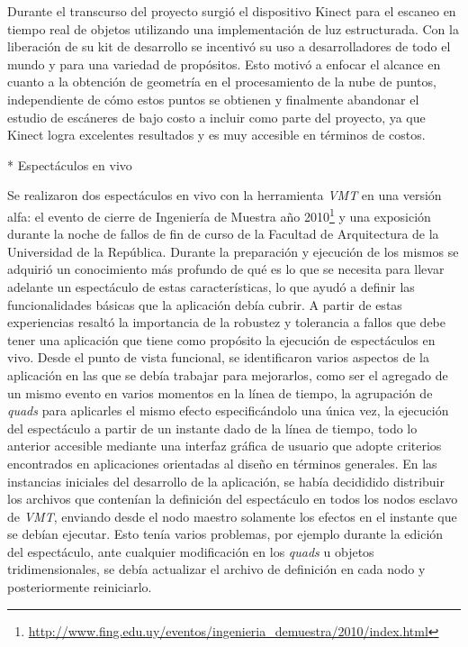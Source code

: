 Durante el transcurso del proyecto surgió el dispositivo Kinect para el escaneo en tiempo real de objetos utilizando una implementación de luz estructurada. Con la liberación de su kit de desarrollo se incentivó su uso a desarrolladores de todo el mundo y para una variedad de propósitos. Esto motivó a enfocar el alcance en cuanto a la obtención de geometría en el procesamiento de la nube de puntos, independiente de cómo estos puntos se obtienen y finalmente abandonar el estudio de escáneres de bajo costo a incluir como parte del proyecto, ya que Kinect logra excelentes resultados y es muy accesible en términos de costos.


* Espectáculos en vivo

Se realizaron dos espectáculos en vivo con la herramienta \emph{VMT} en una versión alfa: el evento de cierre de Ingeniería de Muestra año 2010\footnote{\url{http://www.fing.edu.uy/eventos/ingenieria_demuestra/2010/index.html}} y una exposición durante la noche de fallos de fin de curso de la Facultad de Arquitectura de la Universidad de la República. Durante la preparación y ejecución de los mismos se adquirió un conocimiento más profundo de qué es lo que se necesita para llevar adelante un espectáculo de estas características, lo que ayudó a definir las funcionalidades básicas que la aplicación debía cubrir. A partir de estas experiencias resaltó la importancia de la robustez y tolerancia a fallos que debe tener una aplicación que tiene como propósito la ejecución de espectáculos en vivo.
Desde el punto de vista funcional, se identificaron varios aspectos de la aplicación en las que se debía trabajar para mejorarlos, como ser el agregado de un mismo evento en varios momentos en la línea de tiempo, la agrupación de \emph{quads} para aplicarles el mismo efecto especificándolo una única vez, la ejecución del espectáculo a partir de un instante dado de la línea de tiempo, todo lo anterior accesible mediante una interfaz gráfica de usuario que adopte criterios encontrados en aplicaciones orientadas al diseño en términos generales.
En las instancias iniciales del desarrollo de la aplicación, se había decididido distribuir los archivos que contenían la definición del espectáculo en todos los nodos esclavo de \emph{VMT}, enviando desde el nodo maestro solamente los efectos en el instante que se debían ejecutar. Esto tenía varios problemas, por ejemplo durante la edición del espectáculo, ante cualquier modificación en los \emph{quads} u objetos tridimensionales, se debía actualizar el archivo de definición en cada nodo y posteriormente reiniciarlo.
